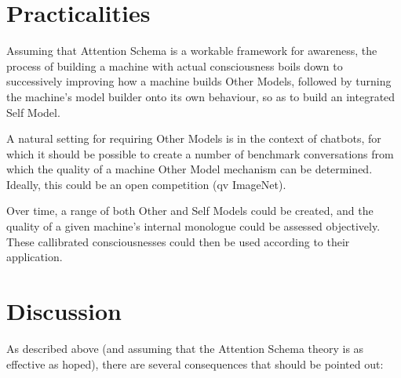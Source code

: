 \documentclass[citeauthoryear]{llncs}
\begin{document}

\section{Practicalities}


Assuming that Attention Schema is a workable framework for awareness,
the process of building a machine with actual consciousness boils down
to successively improving how a machine builds Other Models, 
followed by turning the machine's model builder onto its own behaviour,
so as to build an integrated Self Model.

A natural setting for requiring Other Models is in the context of chatbots,
for which it should be possible to create a number of benchmark conversations 
from which the quality of a machine Other Model mechanism can be determined.  
Ideally, this could be an open competition (qv ImageNet).

Over time, a range of both Other and Self Models could be created, 
and the quality of a given machine's internal monologue could be assessed objectively.
These callibrated consciousnesses could then be used according to their application.


\section{Discussion}

As described above (and assuming that the Attention Schema theory
is as effective as hoped), there are several consequences that should
be pointed out:
\end{document}
